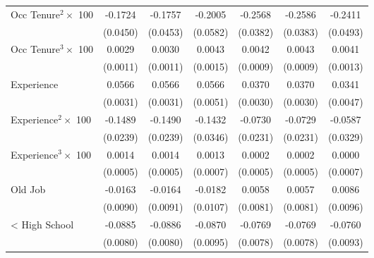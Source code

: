 {\begin{longtable}{l*{6}{c}}
Occ Tenure$^2\times$ 100&     -0.1724\sym{***}&     -0.1757\sym{***}&     -0.2005\sym{***}&     -0.2568\sym{***}&     -0.2586\sym{***}&     -0.2411\sym{***}\\
                    &    (0.0450)         &    (0.0453)         &    (0.0582)         &    (0.0382)         &    (0.0383)         &    (0.0493)         \\
Occ Tenure$^3\times$ 100&      0.0029\sym{***}&      0.0030\sym{***}&      0.0043\sym{***}&      0.0042\sym{***}&      0.0043\sym{***}&      0.0041\sym{***}\\
                    &    (0.0011)         &    (0.0011)         &    (0.0015)         &    (0.0009)         &    (0.0009)         &    (0.0013)         \\
Experience          &      0.0566\sym{***}&      0.0566\sym{***}&      0.0566\sym{***}&      0.0370\sym{***}&      0.0370\sym{***}&      0.0341\sym{***}\\
                    &    (0.0031)         &    (0.0031)         &    (0.0051)         &    (0.0030)         &    (0.0030)         &    (0.0047)         \\
Experience$^2\times$ 100&     -0.1489\sym{***}&     -0.1490\sym{***}&     -0.1432\sym{***}&     -0.0730\sym{***}&     -0.0729\sym{***}&     -0.0587\sym{*}  \\
                    &    (0.0239)         &    (0.0239)         &    (0.0346)         &    (0.0231)         &    (0.0231)         &    (0.0329)         \\
Experience$^3\times$ 100&      0.0014\sym{***}&      0.0014\sym{***}&      0.0013\sym{*}  &      0.0002         &      0.0002         &      0.0000         \\
                    &    (0.0005)         &    (0.0005)         &    (0.0007)         &    (0.0005)         &    (0.0005)         &    (0.0007)         \\
Old Job             &     -0.0163\sym{*}  &     -0.0164\sym{*}  &     -0.0182\sym{*}  &      0.0058         &      0.0057         &      0.0086         \\
                    &    (0.0090)         &    (0.0091)         &    (0.0107)         &    (0.0081)         &    (0.0081)         &    (0.0096)         \\
< High School       &     -0.0885\sym{***}&     -0.0886\sym{***}&     -0.0870\sym{***}&     -0.0769\sym{***}&     -0.0769\sym{***}&     -0.0760\sym{***}\\
                    &    (0.0080)         &    (0.0080)         &    (0.0095)         &    (0.0078)         &    (0.0078)         &    (0.0093)         \\

\end{longtable}}
